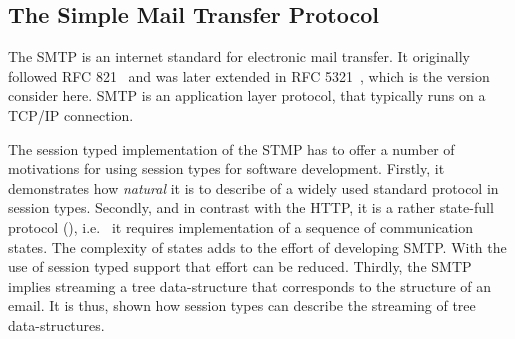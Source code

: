 
\subsection{The Simple Mail Transfer Protocol}
\label{sec:smtp}

The SMTP is an internet standard for electronic
mail transfer. It originally followed
RFC 821~\cite{SMTP-rfc} and was later extended
in RFC 5321~\cite{ESMTP-rfc}, which is the version consider here.
SMTP is an application layer protocol, that typically runs on
a TCP/IP connection.

The session typed implementation of the STMP has to offer
a number of motivations for using session types for software
development.
Firstly, it demonstrates how {\em natural} it is
to describe of a widely used standard protocol in session types.
Secondly, and in contrast with the HTTP, it is
a rather state-full protocol (),
i.e.~ it requires implementation of a sequence of communication states.
The complexity of states adds to the effort of
developing SMTP. With the use of session typed
support that effort can be reduced.
Thirdly, the SMTP implies streaming a tree
data-structure that corresponds to the structure
of an email.
It is thus, shown how session types can describe
the streaming of tree data-structures.


%
%


